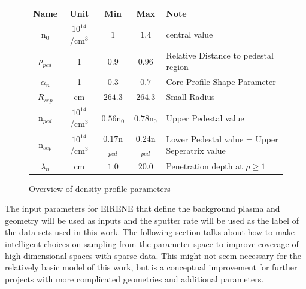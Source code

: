 		\begin{figure}
			\caption{Overview of density profile parameters}
			\begin{tabular}[width=\textwidth]{c|c|c|c|l}
				Name & Unit & Min & Max & Note \\
				\hline
				n$_0$ & $10^{14}$/cm$^3$ & $1$ &  $1.4$ & central value \\
				$\rho_{ped}$ & 1 & $0.9$ &  $0.96$ & Relative Distance to pedestal region \\
				$\alpha_{n}$ & 1 & $0.3$ &  $0.7$ & Core Profile Shape Parameter \\
				$R_{sep}$ & cm & $264.3$ &  $264.3$ & Small Radius \\
				n$_{ped}$ & $10^{14}$/cm$^3$ & $0.56$n$_0$ &  $0.78$n$_0$ & Upper Pedestal value \\
				n$_{sep}$ & $10^{14}$/cm$^3$ & $0.17$n$_{ped}$ &  $0.24$n$_{ped}$ & Lower Pedestal value = Upper Seperatrix value \\
				$\lambda_n$ & cm & $1.0$ &  $20.0$ & Penetration depth at $\rho \ge 1$\\
			\end{tabular}
			\label{Tab:Parametern}
		\end{figure}
		
		The input parameters for EIRENE that define the background plasma and geometry will be used as inputs and the sputter rate will be used as the label of the data sets used in this work. The following section talks about how to make intelligent choices on sampling from the parameter space to improve coverage of high dimensional spaces with sparse data. This might not seem necessary for the relatively basic model of this work, but is a conceptual improvement for further projects with more complicated geometries and additional parameters.
		
